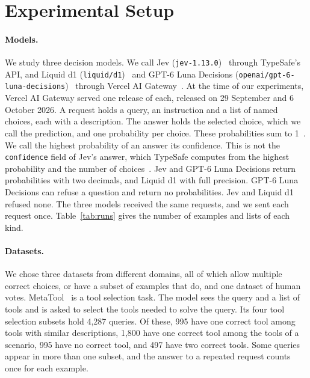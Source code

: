 \section{Experimental Setup}
\label{sec:setup}

\begin{table}[t]
\caption{The datasets, with the number of examples by their number of correct choices, given in brackets for two or more. A list has 10 choices, except the MetaTool scenario lists, with 5, 10 or 15 tools (100, 1,400 and 300 queries), and 60 HotpotQA lists, with 2 to 9 passages. The ChaosNLI examples have no correct choices. Each has the votes of 100 annotators.}
\label{tab:datasets}
\centering
\small

\end{table}

\paragraph{Models.}
We study three decision models. We call Jev (\texttt{jev-1.13.0})~\citep{almeida2026jev} through TypeSafe's API, and Liquid d1 (\texttt{liquid/d1})~\citep{liquidAI2026d1} and GPT-6 Luna Decisions (\texttt{openai/gpt-6-luna-decisions})~\citep{openai2026decisions} through Vercel AI Gateway~\citep{vercel2026models}. At the time of our experiments, Vercel AI Gateway served one release of each, released on 29 September and 6 October 2026. A request holds a query, an instruction and a list of named choices, each with a description. The answer holds the selected choice, which we call the prediction, and one probability per choice. These probabilities sum to 1~\citep{typesafe2026choice}. We call the highest probability of an answer its confidence. This is not the \texttt{confidence} field of Jev's answer, which TypeSafe computes from the highest probability and the number of choices~\citep{typesafe2026confidence}. Jev and GPT-6 Luna Decisions return probabilities with two decimals, and Liquid d1 with full precision. GPT-6 Luna Decisions can refuse a question and return no probabilities. Jev and Liquid d1 refused none. The three models received the same requests, and we sent each request once. Table~\ref{tab:runs} gives the number of examples and lists of each kind.

\paragraph{Datasets.}
We chose three datasets from different domains, all of which allow multiple correct choices, or have a subset of examples that do, and one dataset of human votes. MetaTool~\citep{huang2024metatool} is a tool selection task. The model sees the query and a list of tools and is asked to select the tools needed to solve the query. Its four tool selection subsets hold 4,287 queries. Of these, 995 have one correct tool among tools with similar descriptions, 1,800 have one correct tool among the tools of a scenario, 995 have no correct tool, and 497 have two correct tools. Some queries appear in more than one subset, and the answer to a repeated request counts once for each example.

